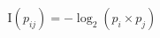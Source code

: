 \documentclass[preview]{standalone}
\begin{document}
\begin{align*}
\mathrm{I}(p_{ij}) = -\log_2(p_i \times p_j)
\end{align*}
\end{document}
